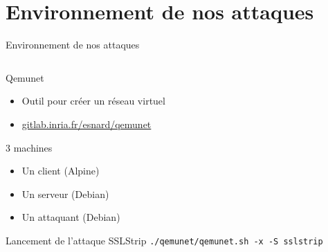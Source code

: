 \section{Environnement de nos attaques}


\begin{frame}[fragile]{Environnement de nos attaques}
  \begin{columns}
    \begin{column}{0.5\textwidth}
      \begin{block}{Qemunet}
        \begin{itemize}
        \item Outil pour créer un réseau virtuel
        \item \url{gitlab.inria.fr/esnard/qemunet}
        \end{itemize}
      \end{block}

      \begin{exampleblock}{3 machines}
        \begin{itemize}
        \item Un client (Alpine)
        \item Un serveur (Debian)
        \item Un attaquant (Debian)
        \end{itemize}
      \end{exampleblock}

      \begin{exampleblock}{Lancement de l'attaque SSLStrip}
        \verb+./qemunet/qemunet.sh -x -S sslstrip+

      \end{exampleblock}

    \end{column}


\end{columns}
\end{frame}
